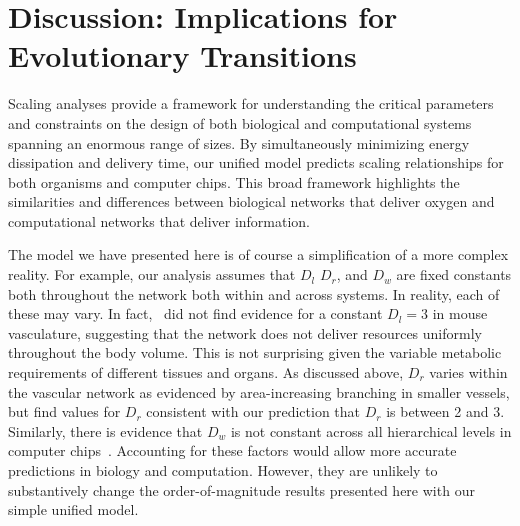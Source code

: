 \documentclass[12pt]{article}
\begin{document}
\section{Discussion: Implications for Evolutionary Transitions}
\label{sec:discussion}

Scaling analyses provide a framework for understanding the critical parameters and constraints on the design of both biological and computational systems spanning an
enormous range of sizes.  By simultaneously minimizing energy dissipation and delivery
time, our unified model 
predicts scaling relationships for both
organisms and computer chips.  This broad framework highlights the similarities
and differences between biological networks that deliver oxygen and
computational networks that deliver information. 

The model we have presented here is of course a simplification of a more complex reality. For example, our analysis assumes that $D_l$ $D_r$, and $D_w$ are fixed constants both throughout the network both within and across systems. In reality, each of these may vary. In fact,~\cite{newberry2015testing} did not find evidence for a constant $D_l = 3$ in mouse vasculature, suggesting that the network does not deliver resources uniformly throughout the body volume. This is not surprising given the variable metabolic requirements of different tissues and organs. As discussed above, $D_r$ varies within the vascular network as evidenced by area-increasing branching in smaller vessels, but \cite{newberry2015testing} find values for $D_r$ consistent with our prediction that $D_r$ is between 2 and 3. Similarly, there is evidence that $D_w$ is not constant across all hierarchical levels in computer chips~\cite{ozaktas2004information}. Accounting for these factors would allow more accurate predictions in biology and computation.  However, they are unlikely to substantively change the order-of-magnitude results presented here with our simple unified model. 
\end{document}
